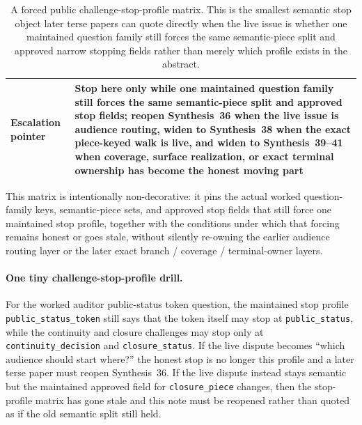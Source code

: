 \documentclass[11pt]{article}
\begin{document}
\begin{table}[t]
\begin{tabularx}{\linewidth}{@{}lX@{}}
Escalation pointer & Stop here only while one maintained question family still forces the same semantic-piece split and approved stop fields; reopen Synthesis~36 when the live issue is audience routing, widen to Synthesis~38 when the exact piece-keyed walk is live, and widen to Synthesis~39--41 when coverage, surface realization, or exact terminal ownership has become the honest moving part \\
\bottomrule
\end{tabularx}
\caption{A forced public challenge-stop-profile matrix. This is the smallest semantic stop object later terse papers can quote directly when the live issue is whether one maintained question family still forces the same semantic-piece split and approved narrow stopping fields rather than merely which profile exists in the abstract.}
\label{tab:forced-public-challenge-stop-profile-matrix}
\end{table}

This matrix is intentionally non-decorative: it pins the actual worked question-family keys, semantic-piece sets, and approved stop fields that still force one maintained stop profile, together with the conditions under which that forcing remains honest or goes stale, without silently re-owning the earlier audience routing layer or the later exact branch / coverage / terminal-owner layers.\cite{series:workedexample}

\paragraph{One tiny challenge-stop-profile drill.}
For the worked auditor public-status token question, the maintained stop profile \nolinkurl{public_status_token} still says that the token itself may stop at \nolinkurl{public_status}, while the continuity and closure challenges may stop only at \nolinkurl{continuity_decision} and \nolinkurl{closure_status}. If the live dispute becomes ``which audience should start where?'' the honest stop is no longer this profile and a later terse paper must reopen Synthesis~36. If the live dispute instead stays semantic but the maintained approved field for \nolinkurl{closure_piece} changes, then the stop-profile matrix has gone stale and this note must be reopened rather than quoted as if the old semantic split still held.\cite{series:workedexample}
\end{document}
